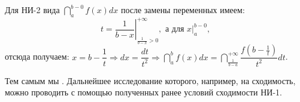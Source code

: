 \begin{note}
	
	Для НИ-2 вида $\dint\limits_{a}^{b-0}f(x)dx$ после замены переменных имеем:
	\begin{equation*}
	t = \left.\dfrac{1}{b-x} \right|_{\frac{1}{b-x	} > 0}^{+ \infty}, \text{ а для } \left.x\right|_{a}^{b-0},
	\end{equation*}
	отсюда получаем: $x = b - \dfrac{1}{t} \Rightarrow dx = \dfrac{dt}{t^2} \Rightarrow \dint\limits_{a}^{b} f(x)dx = \dint\limits_{\frac{1}{b-a}}^{+\infty} \dfrac{f(b-\frac{1}{t})}{t^2}dt$.
	
	Тем самым мы . Дальнейшее исследование которого, например, на сходимость, можно проводить с помощью полученных ранее условий сходимости НИ-1.
\end{note}